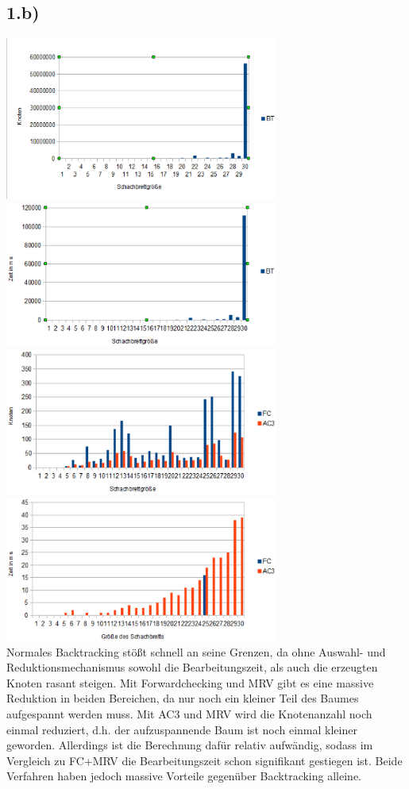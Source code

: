 \documentclass[a4paper]{article}
\begin{document}
\subsection*{1.b)}
\includegraphics[width=9cm]{btk}
\includegraphics[width=9cm]{btz}\\
\includegraphics[width=9cm]{fcack}
\includegraphics[width=9cm]{fcacz}\\
Normales Backtracking stößt schnell an seine Grenzen, da ohne Auswahl- und Reduktionsmechanismus sowohl die Bearbeitungszeit, als auch die erzeugten Knoten rasant steigen. Mit Forwardchecking und MRV gibt es eine massive Reduktion in beiden Bereichen, da nur noch ein kleiner Teil des Baumes aufgespannt werden muss. Mit AC3 und MRV wird die Knotenanzahl noch einmal reduziert, d.h. der aufzuspannende Baum ist noch einmal kleiner geworden. Allerdings ist die Berechnung dafür relativ aufwändig, sodass im Vergleich zu FC+MRV die Bearbeitungszeit schon signifikant gestiegen ist. Beide Verfahren haben jedoch massive Vorteile gegenüber Backtracking alleine.
\end{document}
